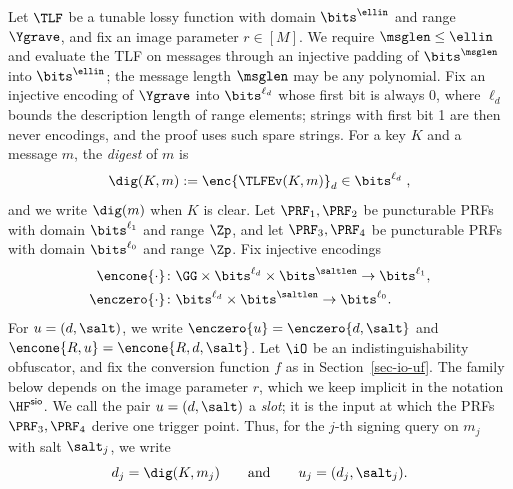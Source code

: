 Let $\TLF$ be a tunable lossy function with domain $\bits^{\ellin}$ and range $\Ygrave$, and fix an image parameter $r\in[M]$. We require $\msglen\le\ellin$ and evaluate the TLF on messages through an injective padding of $\bits^{\msglen}$ into $\bits^{\ellin}$; the message length $\msglen$ may be any polynomial. Fix an injective encoding of $\Ygrave$ into $\bits^{\ell_d}$ whose first bit is always 0, where $\ell_d$ bounds the description length of range elements; strings with first bit 1 are then never encodings, and the proof uses such spare strings. For a key $K$ and a message $m$, the \emph{digest} of $m$ is
$$
\dig(K,m) := \enc{\TLFEv(K,m)}_d \in \bits^{\ell_d} \;,
$$
and we write $\dig(m)$ when $K$ is clear. Let $\PRF_1,\PRF_2$ be puncturable PRFs with domain $\bits^{\ell_1}$ and range $\Zp$, and let $\PRF_3,\PRF_4$ be puncturable PRFs with domain $\bits^{\ell_0}$ and range $\Zp$. Fix injective encodings
$$
\begin{aligned}
\encone{\cdot}&\colon\GG\times\bits^{\ell_d}\times\bits^{\saltlen}\to\bits^{\ell_1},\\
\enczero{\cdot}&\colon\bits^{\ell_d}\times\bits^{\saltlen}\to\bits^{\ell_0}.
\end{aligned}
$$
For $u=(d,\salt)$, we write $\enczero{u}=\enczero{d,\salt}$ and $\encone{R,u}=\encone{R,d,\salt}$. Let $\iO$ be an indistinguishability obfuscator, and fix the conversion function $f$ as in Section~\ref{sec-io-uf}. The family below depends on the image parameter $r$, which we keep implicit in the notation $\HF^{\mathsf{sio}}$. We call the pair $u=(d,\salt)$ a \emph{slot}; it is the input at which the PRFs $\PRF_3,\PRF_4$ derive one trigger point. Thus, for the $j$-th signing query on $m_j$ with salt $\salt_j$, we write
$$
d_j=\dig(K,m_j)
\qquad\text{and}\qquad
u_j=(d_j,\salt_j).
$$

